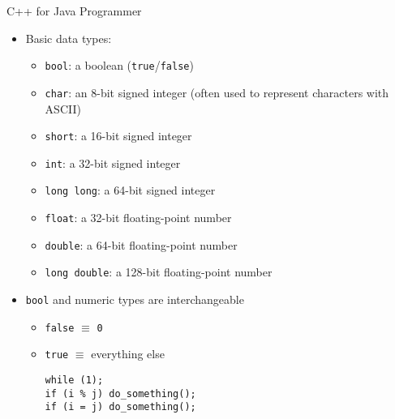 \documentclass[12pt,t]{beamer}
\newcommand{\bi}{\begin{itemize}}
\newcommand{\ei}{\end{itemize}}
\begin{document}
\begin{frame}[fragile]{C++ for Java Programmer}
    \bi
        \vspace{20pt}

        \item Basic data types:
        \bi
            \item \texttt{bool}: a boolean (\texttt{true}/\texttt{false})
            \vspace{5pt}
            \item \texttt{char}: an 8-bit signed integer (often used to represent characters with ASCII)
            \item \texttt{short}: a 16-bit signed integer
            \item \texttt{int}: a 32-bit signed integer
            \item \texttt{long long}: a 64-bit signed integer
            \vspace{5pt}
            \item \texttt{float}: a 32-bit floating-point number
            \item \texttt{double}: a 64-bit floating-point number
            \item \texttt{long double}: a 128-bit floating-point number
        \ei
        \item \texttt{bool} and numeric types are interchangeable
        \bi
	  \item \texttt{false} $\equiv$ \texttt{0}
	  \item \texttt{true} $\equiv$ everything else
      \begin{verbatim}
while (1);
if (i % j) do_something();
if (i = j) do_something();
        \end{verbatim}
        \ei
    \ei
\end{frame}
\end{document}
